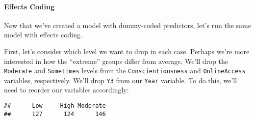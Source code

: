 \documentclass[
]{article}
\newenvironment{Shaded}{\begin{snugshade}}{\end{snugshade}}
\newcommand{\AttributeTok}[1]{\textcolor[rgb]{0.13,0.29,0.53}{#1}}
\newcommand{\FunctionTok}[1]{\textcolor[rgb]{0.13,0.29,0.53}{\textbf{#1}}}
\newcommand{\NormalTok}[1]{#1}
\newcommand{\OtherTok}[1]{\textcolor[rgb]{0.56,0.35,0.01}{#1}}
\newcommand{\SpecialCharTok}[1]{\textcolor[rgb]{0.81,0.36,0.00}{\textbf{#1}}}
\newcommand{\StringTok}[1]{\textcolor[rgb]{0.31,0.60,0.02}{#1}}
\begin{document}
\hypertarget{effects-coding}{%
\paragraph{Effects Coding}\label{effects-coding}}

Now that we've created a model with dummy-coded predictors, let's run the same model with effects coding.

First, let's consider which level we want to drop in each case. Perhaps we're more interested in how the ``extreme'' groups differ from average. We'll drop the \texttt{Moderate} and \texttt{Sometimes} levels from the \texttt{Conscientiousness} and \texttt{OnlineAccess} variables, respectively. We'll drop \texttt{Y3} from our \texttt{Year} variable. To do this, we'll need to reorder our variables accordingly:

\begin{Shaded}
\end{Shaded}

\begin{verbatim}
##      Low     High Moderate 
##      127      124      146
\end{verbatim}

\begin{Shaded}
\end{Shaded}
\end{document}
